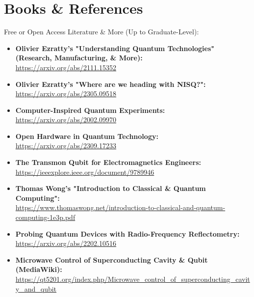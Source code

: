\chapter{\LARGE{Books \& References}}

\large\begin{flushleft} Free or Open Access Literature \& More (Up to Graduate-Level):
\end{flushleft}

\centering

\normalsize\begin{itemize}

  \item\textbf{Olivier Ezratty's "Understanding Quantum Technologies" \\(Research, Manufacturing, \& More):}\\
\url{https://arxiv.org/abs/2111.15352}

  \item\textbf{Olivier Ezratty's "Where are we heading with NISQ?":}\\
\url{https://arxiv.org/abs/2305.09518}

  \item\textbf{Computer-Inspired Quantum Experiments:}\\
\url{https://arxiv.org/abs/2002.09970}

  \item\textbf{Open Hardware in Quantum Technology:}\\
\url{https://arxiv.org/abs/2309.17233}

  \item\textbf{The Transmon Qubit for Electromagnetics Engineers:}\\
\url{https://ieeexplore.ieee.org/document/9789946}

  \item\textbf{Thomas Wong's "Introduction to Classical \& Quantum Computing":}\\
\url{https://www.thomaswong.net/introduction-to-classical-and-quantum-computing-1e3p.pdf}

  \item\textbf{Probing Quantum Devices with Radio-Frequency Reflectometry:}\\
\url{https://arxiv.org/abs/2202.10516}

  \item\textbf{Microwave Control of Superconducting Cavity \& Qubit (MediaWiki):}\\
\url{https://qt5201.org/index.php/Microwave_control_of_superconducting_cavity_and_qubit}


\end{itemize}
